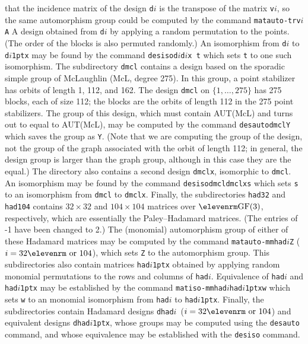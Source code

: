 {          that the incidence matrix of the design {\tt d}\kern1pt$i$ is the
          transpose of the matrix {\tt v}\kern1pt$i$, so the same automorphism
          group could be computed by the command
   \smallskip
   \hskip0.4in{\tt matauto\quad -tr\quad v\kern1pt$i$\quad A}
   \medbreak
   \noindent{}A design obtained from
                     {\tt d}\kern1pt$i$ by applying a random permutation to the
                     points.  (The order of the blocks is also permuted
                     randomly.)  An isomorphism from {\tt d}\kern1pt$i$ to
                     {\tt d\kern1pt$i$\kern1ptx} may be found by the command
   \smallskip
   \hskip0.4in{\tt desiso\quad d\kern1pt$i$\quad d\kern1pt$i$x t}
   \smallskip
          which sets {\tt t} to one such isomorphism.
\vskip0pt}
\bigbreak
The subdirectory {\tt dmcl} contains a design based on
the sporadic simple group of McLaughlin (McL, degree 275).  In this group,
a point stabilizer has orbits of length 1, 112, and 162.  The design
{\tt dmcl} on $\{1,\ldots,275\}$ has 275 blocks, each of size 112; the
blocks are the orbits of length 112 in the 275 point stabilizers.
The group of this design, which must contain AUT(McL) and turns out to
equal to AUT(McL), may be computed by the command
\smallskip
\hskip0.4in{\tt desauto\quad dmcl\quad Y}
\smallskip
which saves the group as {\tt Y}.  (Note that we are computing the group
of the design, not the group of the graph associated with the orbit of
length 112; in general, the design group is larger than the graph group,
although in this case they are the equal.)  The directory also contains a
second design {\tt dmclx}, isomorphic to {\tt dmcl}.  An isomorphism may
be found by the command
\smallskip
\hskip0.4in{\tt desiso\quad dmcl\quad dmclx\quad s}
\smallskip
which sets {\tt s} to an isomorphism from {\tt dmcl} to {\tt dmclx}.
\bigbreak
Finally, the subdirectories {\tt had32} and {\tt had104} 
contains  $32\times32$ and $104\times104$ matrices
over ${\rm GF}(3)$, respectively, which are 
essentially the Paley--Hadamard matrices.  
(The entries of -1 have been changed to 2.)  The (monomial) automorphism
group of either of these Hadamard matrices may be computed by the command
\smallskip
\hskip0.4in{\tt matauto\quad -mm\quad had\kern1pt$i$\quad Z}
\smallskip
($i = 32{\rm\ or\ }104$),
which sets {\tt Z} to the automorphism group.  This subdirectories also
contain matrices {\tt had\kern1pt$i$\kern1ptx} obtained by 
applying random monomial
permutations to the rows and columns of {\tt had\kern1pt$i$}.  Equivalence of
{\tt had\kern1pt$i$} and {\tt had\kern1pt$i$\kern1ptx} may be 
established by the command
\smallskip
\hskip0.4in{\tt matiso\quad -mm\quad had\kern1pt$i$\quad had\kern1pt$i$\kern1ptx\quad w}
\smallskip
which sets {\tt w} to an monomial isomorphism 
from {\tt had\kern1pt$i$} to {\tt had\kern1pt$i$\kern1ptx}.
Finally, the subdirectories contain Hadamard designs {\tt dhad\kern1pt$i$}\kern3pt\
($i = 32{\rm\ or\ }104$) and equivalent designs {\tt dhad\kern1pt$i$\kern1ptx},
whose groups may be computed using the {\tt desauto} command, and whose
equivalence may be established with the {\tt desiso} command.
%
%
